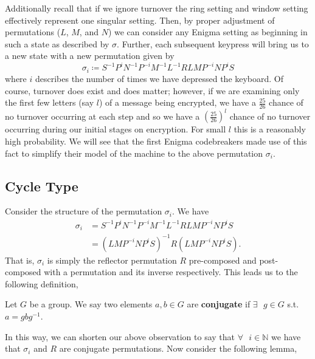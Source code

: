 Additionally recall that if we ignore turnover the ring setting and
window setting effectively represent one singular setting.
Then, by proper adjustment of permutations ($L$, $M$, and $N$) we can
consider any Enigma setting as beginning in such a state as described
by $\sigma$. Further, each subsequent keypress will bring us to a new
state with a new permutation given by
\[
	\sigma_i \coloneq S^{-1}P^{i}N^{-1}P^{-i}M^{-1}L^{-1}RLMP^{-i}NP^{i}S
\]
where $i$ describes the number of times we have depressed the
keyboard. Of course, turnover does exist and does matter; however, if
we are examining only the first few letters (say $l$) of a message
being encrypted, we have a $\frac{25}{26}$ chance of no turnover
occurring at each step and so we have a $(\frac{25}{26})^l$ chance of
no turnover occurring during our initial stages on encryption. For
small $l$ this is a reasonably high probability. We will see that the
first Enigma codebreakers made use of this
fact to simplify their model of the machine to the above permutation $\sigma_i$.

\subsection{Cycle Type}
Consider the structure of the permutation $\sigma_i$. We have
\begin{align*}
	\sigma_i & = S^{-1}P^{i}N^{-1}P^{-i}M^{-1}L^{-1}RLMP^{-i}NP^{i}S \\
	         & = (LMP^{-i}NP^{i}S)^{-1}R(LMP^{-i}NP^{i}S).
\end{align*}
That is, $\sigma_i$ is simply the reflector permutation $R$
pre-composed and post-composed with a permutation and its inverse
respectively. This leads us to the following definition,

\begin{definition}
	Let $G$ be a group. We say two elements $a,b\in{G}$ are
		{\bf{conjugate}} if $\exists\text{ }g\in{G}$ s.t. $a=gbg^{-1}$.
\end{definition}
In this way, we can shorten our above observation to say that
$\forall\text{ }i\in\mathbb{N}$ we have that $\sigma_i$ and $R$ are
conjugate permutations. Now consider the following lemma,

